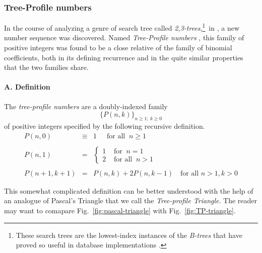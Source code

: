 \subsubsection{Tree-Profile numbers}
\label{sec:Tree-Profile-numbers}

In the course of analyzing a genre of search tree called {\it
  2,3-trees},\footnote{These search trees are the lowest-index
  instances of the {\it B-trees} that have proved so useful in database
  implementations \cite{CLRS}.}~in \cite{MillerPRS79,RosenbergS78}, a
new number sequence was discovered.
Named {\it Tree-Profile numbers} \cite{Rosenberg79}, this family of
positive integers was found to be a close relative of the family of
binomial coefficients, both in its defining recurrence and in the
quite similar properties that the two families share.

\paragraph{\small\sf A. Definition}

The {\it tree-profile numbers} are a doubly-indexed family
\[ \big\{ P(n,k) \big\}_{n \geq 1; \ k \geq 0}  \]
of positive integers specified by the following recursive definition.
\begin{equation}
\label{eq:TP-defn}
\begin{array}{ccl}
P(n,0) & \equiv & 1 \ \ \ \ \ \mbox{ for all } \ n \geq 1 \\
  & & \\
P(n,1) & = &
  {\displaystyle
\left\{
\begin{array}{cl}
 1 & \mbox{ for } \ n=1 \\
 2 & \mbox{ for all } \ n > 1
\end{array}
\right.  } \\
  & & \\
P(n+1, k+1) & = & P(n,k) + 2 P(n, k-1) \ \ \  \mbox{ for all } n > 1, k > 0
\end{array}
\end{equation}

This somewhat complicated definition can be better understood with the
help of an analogue of Pascal's Triangle that we call the {\it
  Tree-profile Triangle}.  The reader may want to comapare
Fig.~\ref{fig:pascal-triangle} with Fig.~\ref{fig:TP-triangle}.

